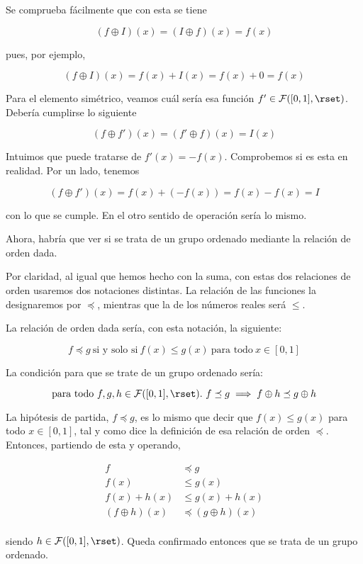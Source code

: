 \noindent Se comprueba fácilmente que con esta se tiene

$$ (f \oplus I)(x) = (I \oplus f)(x) = f(x) $$

\noindent pues, por ejemplo,

$$ (f \oplus I)(x) = f(x) + I(x) = f(x) + 0 = f(x) $$

Para el elemento simétrico, veamos cuál sería esa función $f' \in
\mathcal{F}([0, 1], \rset)$. Debería cumplirse lo siguiente

$$ (f \oplus f')(x) = (f' \oplus f)(x) = I(x) $$

Intuimos que puede tratarse de $f'(x) = {-f(x)}$. Comprobemos si es esta en
realidad. Por un lado, tenemos

$$ (f \oplus f')(x) = f(x) + ({-f(x)}) = f(x) - f(x) = I $$

\noindent con lo que se cumple. En el otro sentido de operación sería lo
mismo.

Ahora, habría que ver si se trata de un grupo ordenado mediante la relación
de orden dada.

Por claridad, al igual que hemos hecho con la suma, con estas dos relaciones
de orden usaremos dos notaciones distintas. La relación de las funciones la
designaremos por $\preceq$, mientras que la de los números reales será
$\leq$.

La relación de orden dada sería, con esta notación, la siguiente:

$$ f \preceq g \ \text{si y solo si} \ f(x) \leq g(x) \ \text{para todo} \ x
\in [0,1] $$

La condición para que se trate de un grupo ordenado sería:

$$ \text{para todo} \ f, g, h \in \mathcal{F}([0, 1], \rset). \ f \preceq g
\implies f \oplus h \preceq g \oplus h $$

La hipótesis de partida, $f \preceq g$, es lo mismo que decir que $f(x) \leq
g(x)$ para todo $x \in [0, 1]$, tal y como dice la definición de esa
relación de orden $\preceq$. Entonces, partiendo de esta y operando,

\begin{align*}
  f &\preceq g \\
  f(x) &\leq g(x) \\
  f(x) + h(x) &\leq g(x) + h(x) \\
  (f \oplus h)(x) &\preceq (g \oplus h)(x) \\
\end{align*}

\noindent siendo $h \in \mathcal{F}([0, 1], \rset)$. Queda confirmado
entonces que se trata de un grupo ordenado.

